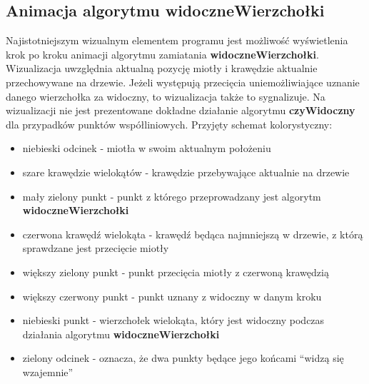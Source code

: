 \documentclass{article}
\begin{document}
\subsection{Animacja algorytmu \textbf{widoczneWierzchołki}}
\qquad Najistotniejszym wizualnym elementem programu jest możliwość wyświetlenia krok po kroku animacji algorytmu zamiatania \textbf{widoczneWierzchołki}. Wizualizacja uwzględnia aktualną pozycję miotły i krawędzie aktualnie przechowywane na drzewie. Jeżeli występują przecięcia uniemożliwiające uznanie danego wierzchołka za widoczny, to wizualizacja także to sygnalizuje. Na wizualizacji nie jest prezentowane dokładne działanie algorytmu \textbf{czyWidoczny} dla przypadków punktów współliniowych. Przyjęty schemat kolorystyczny:

\begin{itemize}
\item niebieski odcinek - miotła w swoim aktualnym położeniu
\item szare krawędzie wielokątów - krawędzie przebywające aktualnie na drzewie
\item mały zielony punkt - punkt z którego przeprowadzany jest algorytm \textbf{widoczneWierzchołki}
\item czerwona krawędź wielokąta - krawędź będąca najmniejszą w drzewie, z którą sprawdzane jest przecięcie miotły
\item większy zielony punkt - punkt przecięcia miotły z czerwoną krawędzią
\item większy czerwony punkt - punkt uznany z widoczny w danym kroku
\item niebieski punkt - wierzchołek wielokąta, który jest widoczny podczas działania algorytmu \textbf{widoczneWierzchołki}
\item zielony odcinek - oznacza, że dwa punkty będące jego końcami ``widzą się wzajemnie''
\end{itemize}
\end{document}

